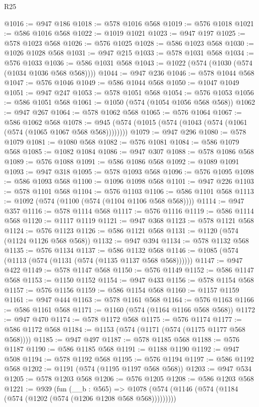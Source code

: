 \begin{lexlean}{R25}
\begin{coremodule}
@1016 := @947 @186
@1018 := @578 @1016 @568
@1019 := @576 @1018
@1021 := @586 @1016 @568
@1022 := @1019 @1021
@1023 := @947 @197
@1025 := @578 @1023 @568
@1026 := @576 @1025
@1028 := @586 @1023 @568
@1030 := @1026 @1028 @568
@1031 := @947 @215
@1033 := @578 @1031 @568
@1034 := @576 @1033
@1036 := @586 @1031 @568
@1043 := @1022 (@574 (@1030 (@574 (@1034 @1036 @568 @568))))
@1044 := @947 @236
@1046 := @578 @1044 @568
@1047 := @576 @1046
@1049 := @586 @1044 @568
@1050 := @1047 @1049
@1051 := @947 @247
@1053 := @578 @1051 @568
@1054 := @576 @1053
@1056 := @586 @1051 @568
@1061 := @1050 (@574 (@1054 @1056 @568 @568))
@1062 := @947 @267
@1064 := @578 @1062 @568
@1065 := @576 @1064
@1067 := @586 @1062 @568
@1078 := @945 (@574 (@1015 (@574 (@1043 (@574 (@1061 (@574 (@1065 @1067 @568 @568))))))))
@1079 := @947 @296
@1080 := @578 @1079
@1081 := @1080 @568
@1082 := @576 @1081
@1084 := @586 @1079 @568
@1085 := @1082 @1084
@1086 := @947 @307
@1088 := @578 @1086 @568
@1089 := @576 @1088
@1091 := @586 @1086 @568
@1092 := @1089 @1091
@1093 := @947 @318
@1095 := @578 @1093 @568
@1096 := @576 @1095
@1098 := @586 @1093 @568
@1100 := @1096 @1098 @568
@1101 := @947 @226
@1103 := @578 @1101 @568
@1104 := @576 @1103
@1106 := @586 @1101 @568
@1113 := @1092 (@574 (@1100 (@574 (@1104 @1106 @568 @568))))
@1114 := @947 @357
@1116 := @578 @1114 @568
@1117 := @576 @1116
@1119 := @586 @1114 @568
@1120 := @1117 @1119
@1121 := @947 @368
@1123 := @578 @1121 @568
@1124 := @576 @1123
@1126 := @586 @1121 @568
@1131 := @1120 (@574 (@1124 @1126 @568 @568))
@1132 := @947 @394
@1134 := @578 @1132 @568
@1135 := @576 @1134
@1137 := @586 @1132 @568
@1146 := @1085 (@574 (@1113 (@574 (@1131 (@574 (@1135 @1137 @568 @568))))))
@1147 := @947 @422
@1149 := @578 @1147 @568
@1150 := @576 @1149
@1152 := @586 @1147 @568
@1153 := @1150 @1152
@1154 := @947 @433
@1156 := @578 @1154 @568
@1157 := @576 @1156
@1159 := @586 @1154 @568
@1160 := @1157 @1159
@1161 := @947 @444
@1163 := @578 @1161 @568
@1164 := @576 @1163
@1166 := @586 @1161 @568
@1171 := @1160 (@574 (@1164 @1166 @568 @568))
@1172 := @947 @470
@1174 := @578 @1172 @568
@1175 := @576 @1174
@1177 := @586 @1172 @568
@1184 := @1153 (@574 (@1171 (@574 (@1175 @1177 @568 @568))))
@1185 := @947 @497
@1187 := @578 @1185 @568
@1188 := @576 @1187
@1190 := @586 @1185 @568
@1191 := @1188 @1190
@1192 := @947 @508
@1194 := @578 @1192 @568
@1195 := @576 @1194
@1197 := @586 @1192 @568
@1202 := @1191 (@574 (@1195 @1197 @568 @568))
@1203 := @947 @534
@1205 := @578 @1203 @568
@1206 := @576 @1205
@1208 := @586 @1203 @568
@1221 := @939
    (fun (__b : @565) =>
    @1078 (@574 (@1146 (@574 (@1184 (@574 (@1202 (@574 (@1206 @1208 @568 @568)))))))))

\end{coremodule}
\end{lexlean}
